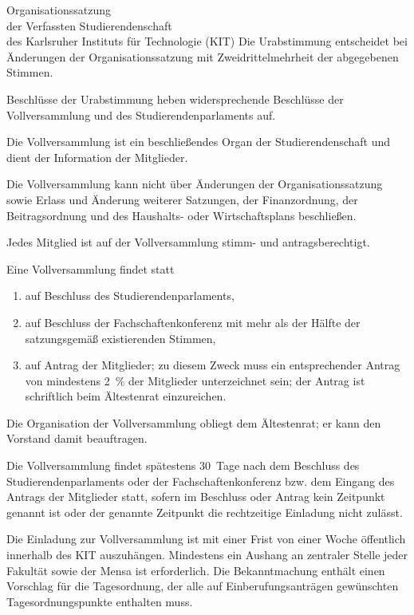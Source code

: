 \begin{jurdoc}[Organisationssatzung]{Organisationssatzung\\der Verfassten Studierendenschaft\\des Karlsruher Instituts für Technologie (KIT)}
Die Urabstimmung entscheidet bei Änderungen der Organisationssatzung mit Zweidrittelmehrheit der abgegebenen Stimmen.

Beschlüsse der Urabstimmung heben widersprechende Beschlüsse der Vollversammlung und des Studierendenparlaments auf.

%
%



Die Vollversammlung ist ein beschließendes Organ der Studierendenschaft und dient der Information der Mitglieder.

Die Vollversammlung kann nicht über Änderungen der Organisationssatzung sowie Erlass und Änderung weiterer Satzungen, der Finanzordnung, der Beitragsordnung und des Haushalts- oder Wirtschaftsplans beschließen.


Jedes Mitglied ist auf der Vollversammlung stimm- und antragsberechtigt.

 \label{vv:zustandekommen}

Eine Vollversammlung findet statt
\begin{enumerate}
\item auf Beschluss des Studierendenparlaments,
\item auf Beschluss der Fachschaftenkonferenz mit mehr als der Hälfte der satzungsgemäß existierenden Stimmen,
\item \label{vv:zustandekommen:mitglieder}auf Antrag der Mitglieder; zu diesem Zweck muss ein entsprechender Antrag von mindestens 2~\% der Mitglieder unterzeichnet sein; der Antrag ist schriftlich beim Ältestenrat einzureichen.
\end{enumerate}


\label{vv:organisation}

Die Organisation der Vollversammlung obliegt dem Ältestenrat; er kann den Vorstand damit beauftragen.

Die Vollversammlung findet spätestens 30~Tage nach dem Beschluss des Studierendenparlaments oder der Fachschaftenkonferenz bzw. dem Eingang des Antrags der Mitglieder statt, sofern im Beschluss oder Antrag kein Zeitpunkt genannt ist oder der genannte Zeitpunkt die rechtzeitige Einladung nicht zulässt.

Die Einladung zur Vollversammlung ist mit einer Frist von einer Woche öffentlich innerhalb des KIT auszuhängen. Mindestens ein Aushang an zentraler Stelle jeder Fakultät sowie der Mensa ist erforderlich. Die Bekanntmachung enthält einen Vorschlag für die Tagesordnung, der alle auf Einberufungsanträgen gewünschten Tagesordnungspunkte enthalten muss.


\end{jurdoc}
